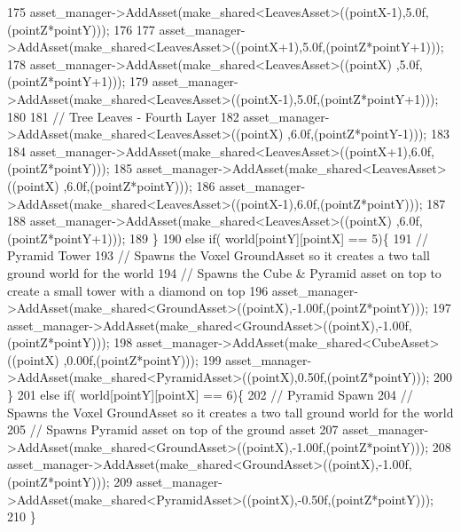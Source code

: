\begin{DoxyCode}
175             asset\_manager->AddAsset(make\_shared<LeavesAsset>((pointX-1),5.0f,(pointZ*pointY)));
176  
177             asset\_manager->AddAsset(make\_shared<LeavesAsset>((pointX+1),5.0f,(pointZ*pointY+1)));
178             asset\_manager->AddAsset(make\_shared<LeavesAsset>((pointX)  ,5.0f,(pointZ*pointY+1)));
179             asset\_manager->AddAsset(make\_shared<LeavesAsset>((pointX-1),5.0f,(pointZ*pointY+1)));
180 
181             \textcolor{comment}{// Tree Leaves - Fourth Layer}
182             asset\_manager->AddAsset(make\_shared<LeavesAsset>((pointX)  ,6.0f,(pointZ*pointY-1)));
183 
184             asset\_manager->AddAsset(make\_shared<LeavesAsset>((pointX+1),6.0f,(pointZ*pointY)));
185             asset\_manager->AddAsset(make\_shared<LeavesAsset>((pointX)  ,6.0f,(pointZ*pointY)));
186             asset\_manager->AddAsset(make\_shared<LeavesAsset>((pointX-1),6.0f,(pointZ*pointY)));
187 
188             asset\_manager->AddAsset(make\_shared<LeavesAsset>((pointX)  ,6.0f,(pointZ*pointY+1)));
189    \}
190     \textcolor{keywordflow}{else} \textcolor{keywordflow}{if}( world[pointY][pointX] == 5)\{
191             \textcolor{comment}{// Pyramid Tower}
193 \textcolor{comment}{}            \textcolor{comment}{// Spawns the Voxel GroundAsset so it creates a two tall ground world for the world}
194             \textcolor{comment}{// Spawns the Cube & Pyramid asset on top to create a small tower with a diamond on top}
196 \textcolor{comment}{}            asset\_manager->AddAsset(make\_shared<GroundAsset>((pointX),-1.00f,(pointZ*pointY)));
197             asset\_manager->AddAsset(make\_shared<GroundAsset>((pointX),-1.00f,(pointZ*pointY)));
198             asset\_manager->AddAsset(make\_shared<CubeAsset>((pointX)  ,0.00f,(pointZ*pointY)));
199             asset\_manager->AddAsset(make\_shared<PyramidAsset>((pointX),0.50f,(pointZ*pointY)));
200    \}
201     \textcolor{keywordflow}{else} \textcolor{keywordflow}{if}( world[pointY][pointX] == 6)\{
202             \textcolor{comment}{// Pyramid Spawn}
204 \textcolor{comment}{}            \textcolor{comment}{// Spawns the Voxel GroundAsset so it creates a two tall ground world for the world}
205             \textcolor{comment}{// Spawns Pyramid asset on top of the ground asset}
207 \textcolor{comment}{}            asset\_manager->AddAsset(make\_shared<GroundAsset>((pointX),-1.00f,(pointZ*pointY)));
208             asset\_manager->AddAsset(make\_shared<GroundAsset>((pointX),-1.00f,(pointZ*pointY)));
209             asset\_manager->AddAsset(make\_shared<PyramidAsset>((pointX),-0.50f,(pointZ*pointY)));
210    \}

\end{DoxyCode}
